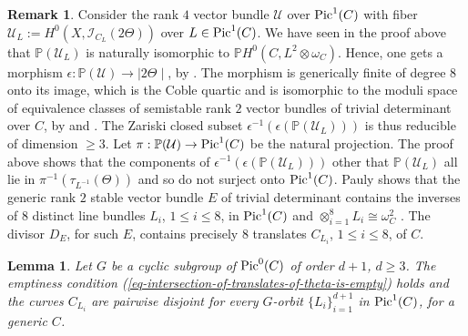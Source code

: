 \documentclass[12pt]{amsart}
\numberwithin{equation}{subsection}
\theoremstyle{plain}
\newtheorem{lem}[thm]{Lemma}
\theoremstyle{definition}
\newtheorem{rem}[thm]{Remark}
\newcommand{\U}{{\mathcal U}}
\newcommand{\PP}{{\mathbb P}}
\newcommand{\linsys}[1]{{\mid}#1{\mid}}
\newcommand{\Pic}{{\rm Pic}}
\newcommand{\Ideal}[1]{{\mathcal I}_{#1}}
\begin{document}
\begin{rem}
Consider the rank $4$ vector bundle $\U$ over $\Pic^1(C)$ with fiber $\U_L:=H^0(X,\Ideal{C_L}(2\Theta))$ over $L\in\Pic^1(C)$. We have seen in the proof above that $\PP(\U_L)$ is naturally isomorphic to $\PP H^0(C,L^2\otimes\omega_C)$. Hence, one gets a morphism $\epsilon:\PP(\U)\rightarrow \linsys{2\Theta}$, by 
\cite[Lemma 3.7]{beauville}. The morphism is generically finite of degree $8$ onto its image, which is the Coble quartic and is isomorphic to the moduli space of equivalence classes of semistable rank $2$ vector bundles of trivial determinant over $C$, by  \cite{NR} and \cite[Sec. 4.1]{pauly}. The Zariski closed subset $\epsilon^{-1}(\epsilon(\PP(\U_L)))$ is thus reducible of dimension $\geq 3$. Let $\pi:\PP(\U)\rightarrow \Pic^1(C)$ be the natural projection. The proof above shows that the components of $\epsilon^{-1}(\epsilon(\PP(\U_L)))$ other that $\PP(\U_L)$ all lie in $\pi^{-1}(\tau_{L^{-1}}(\Theta))$ and so do not surject onto $\Pic^1(C)$. Pauly shows that the generic rank $2$ stable vector bundle $E$ of trivial determinant contains the inverses of $8$ distinct line bundles $L_i$, $1\leq i\leq 8$, in $\Pic^1(C)$ and $\otimes_{i=1}^8 L_i\cong \omega_C^2$ \cite[Lemma 4.2]{pauly}. The divisor $D_E$, for such $E$,  contains precisely $8$ translates $C_{L_i}$, $1\leq i\leq 8$,  of $C$.
\end{rem}

\begin{lem}
\label{lemma-emptiness-condition-holds-when-the-curves-are-an-orbit}
Let $G$ be a cyclic subgroup of $\Pic^0(C)$ of order $d+1$, $d\geq 3$. 
The emptiness condition (\ref{eq-intersection-of-translates-of-theta-is-empty}) holds and the curves $C_{L_i}$ are pairwise disjoint
for every $G$-orbit $\{L_i\}_{i=1}^{d+1}$ in $\Pic^1(C)$, for a generic $C$.
\end{lem}
\end{document}
